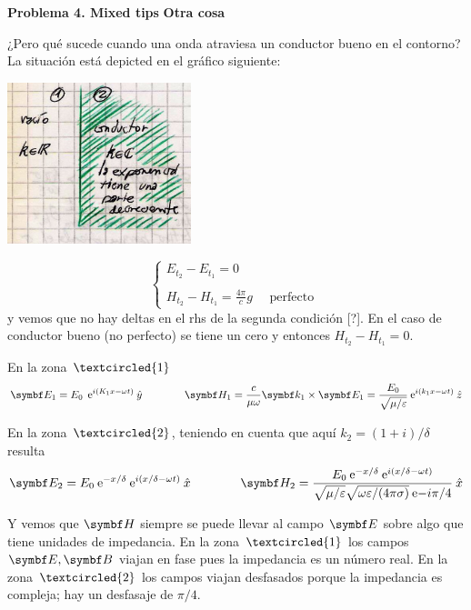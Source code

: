\documentclass[10pt,oneside]{CBFT_book}
\begin{document}
\begin{ejemplo}{\bf Problema 4. Mixed tips}
{\bf Otra cosa}

¿Pero qué sucede cuando una onda atraviesa un conductor bueno en el contorno?
La situación está depicted en el gráfico siguiente:

\includegraphics[width=0.40\textwidth]{images/fig_ft1_problema4B.jpg} 

\[
	\begin{cases}
	 E_{t_2} - E_{t_1} = 0 \\
	 \\
	 H_{t_2} - H_{t_1} = \frac{4 \pi}{c} g \quad \text{ perfecto }
	\end{cases}
\]
y vemos que no hay deltas en el rhs de la segunda condición [?]. En el caso de conductor bueno
(no perfecto) se tiene un cero y entonces $  H_{t_2} - H_{t_1} = 0 $.

En la zona $\textcircled{1}$
\[
	\vb{E}_1 = E_0 \: \euler^{i (K_1x - \omega t)} \yver  \qquad \qquad 
	\vb{H}_1 = \frac{c}{\mu \omega} \pv{k_1}{E_1} = \frac{E_0}{\sqrt{\mu/\varepsilon}} 
	\euler^{i (k_1x - \omega t)} \zver
\]

En la zona $\textcircled{2}$, teniendo en cuenta que aquí $k_2 = (1 + i) / \delta$ resulta
\[
	\vb{E}_2 = E_0 \euler^{-x/\delta} \euler^{i (x/\delta - \omega t)} \xver
	\qquad \qquad 
	\vb{H}_2 = \frac{E_0 \euler^{-x/\delta} \euler^{i (x/\delta - \omega t)} }
	{ \sqrt{\mu/\varepsilon} \sqrt{\omega\varepsilon/(4\pi\sigma)} \euler{-i\pi/4} }\xver
\]

Y vemos que $\vb{H}$ siempre se puede llevar al campo $\vb{E}$ sobre algo que tiene unidades
de impedancia.
En la zona $\textcircled{1}$ los campos $\vb{E}, \vb{B}$ viajan en fase pues la impedancia es un
número real. En la zona $\textcircled{2}$ los campos viajan desfasados porque la impedancia es
compleja; hay un desfasaje de $\pi/4$.
 
\end{ejemplo}



\end{document}
